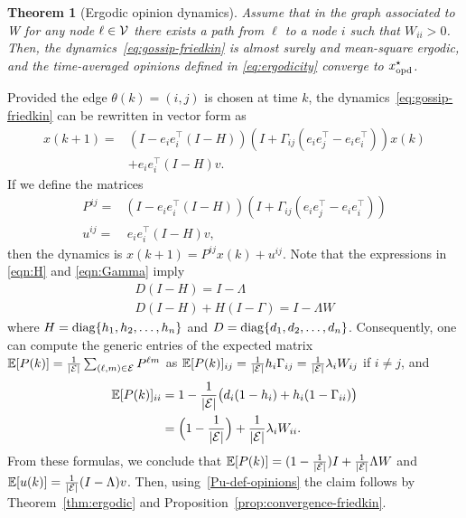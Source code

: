 \documentclass{IEEEtran}
\newtheorem{theorem}{Theorem}
\def\Exp{\mathbb{E}}
\newcommand{\1}{\mathbf{1}} \newcommand{\ind}{\mathds{1}}
\begin{document}
\begin{theorem}[Ergodic opinion dynamics]
\label{thm:gossip-opinions} 
Assume that in the graph
associated to W for any node $\ell\in \mathcal{V}$ there exists a path from
$\ell$ to a node $i$ such that  $W_{ii}>0$.
Then, the dynamics~\eqref{eq:gossip-friedkin} is 
almost surely and mean-square ergodic, and the time-averaged opinions defined in \eqref{eq:ergodicity} converge to ${x_{\textup{opd}}^{\star}}$.
\end{theorem}
\begin{IEEEproof}
Provided the edge $\theta(k)=(i,j)$ is chosen at time $k$, the dynamics~\eqref{eq:gossip-friedkin} can be rewritten in vector form as
\begin{align*}
x(k+1)=&(I-e_ie_i^\top(I-H))\left(I+\Gamma_{ij}(e_ie_j^\top-e_ie_i^\top)\right)x(k)\\&+e_ie_i^\top(I-H)v.
\end{align*}
If we define the matrices 
\begin{align*}P^{ij}=& (I-e_ie_i^\top(I-H))\left(I+\Gamma_{ij}(e_ie_j^\top-e_ie_i^\top)\right)\\
u^{ij}=&\, e_ie_i^\top(I-H)v,\end{align*}
then the dynamics is 
$
x(k+1)=P^{ij} x(k) + u^{ij}.
$
Note that
the expressions in \eqref{eqn:H} and \eqref{eqn:Gamma} imply
\begin{gather*}
D(I-H)=I-\Lambda\\
D(I-H)+H(I-\Gamma)=I-\Lambda W
\end{gather*}
where $H = {\rm diag}\{h_1, h_2, \ldots, h_n\}$ and $D= {\rm diag}\{d_1, d_2, \ldots, d_n\}$. Consequently, one can compute the generic entries of the expected matrix $\Exp[P(k)]=\frac1{\card{\E}} \sum_{(\ell,m)\in\E} P^{\ell m}$ as 
$\Exp[P(k)]_{ij}=\frac{1}{\card{\E}} h_i \Gamma_{ij}=\frac{1}{\card{\E}}\lambda_iW_{ij}$ if $i\neq j$,   and
\begin{align*}\Exp[P(k)]_{ii}&=1-\frac{1}{\card{\E}}\big(   d_i(1-h_i)+h_i(1-\Gamma_{ii})\big)\\
&=\Big(1-\frac{1}{\card{\E}}\Big)+ \frac{1}{\card{\E}} \lambda_iW_{ii} .\end{align*} From these formulas, we conclude that $\Exp[P(k)]=(1-\frac{1}{\card{\E}})I+ \frac{1}{\card{\E}} \Lambda W$ and $\Exp[u(k)] = \frac{1}{\card{\E}} (I-\Lambda)v$.
Then, using~\eqref{Pu-def-opinions} the claim follows by Theorem~\ref{thm:ergodic} and Proposition~\ref{prop:convergence-friedkin}.
\end{IEEEproof}
\end{document}
